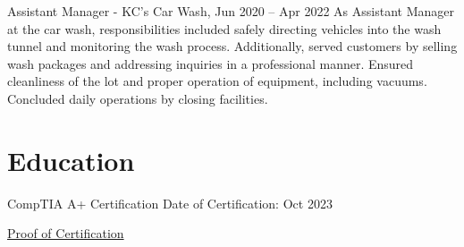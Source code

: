\documentclass{simplecv}
\begin{document}
\begin{topic}
\item[Assistant Manager - KC's Car Wash, Jun 2020 -- Apr 2022]
As Assistant Manager at the car wash, responsibilities included safely directing vehicles into the wash tunnel and monitoring the wash process. Additionally, served customers by selling wash packages and addressing inquiries in a professional manner. Ensured cleanliness of the lot and proper operation of equipment, including vacuums. Concluded daily operations by closing facilities.
\end{topic}

\section{Education}

\begin{topic}
\item[CompTIA A+ Certification]
Date of Certification:  Oct 2023

\href{https://drive.google.com/file/d/1AEhKVefmBUfZywOPLIuJx9v0ueqqA3CI/view?usp=sharing}{Proof of Certification}

\end{topic}
\end{document}
